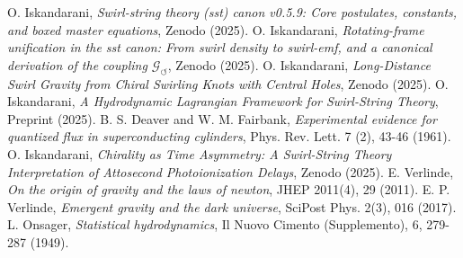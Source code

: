 \documentclass[10pt,reprint,aps,onecolumn,nofootinbib]{revtex4-2}
\begin{document}
        \begin{thebibliography}{99}
         O. Iskandarani, \emph{Swirl-string theory (sst) canon v0.5.9: Core postulates, constants, and boxed master equations}, Zenodo (2025).
         O. Iskandarani, \emph{Rotating-frame unification in the sst canon: From swirl density to swirl-emf, and a canonical derivation of the coupling $\mathcal{G}_{\circlearrowleft}$}, Zenodo (2025).
         O. Iskandarani, \emph{Long-Distance Swirl Gravity from Chiral Swirling Knots with Central Holes}, Zenodo (2025).
         O. Iskandarani, \emph{A Hydrodynamic Lagrangian Framework for Swirl-String Theory}, Preprint (2025).
         B. S. Deaver and W. M. Fairbank, \emph{Experimental evidence for quantized flux in superconducting cylinders}, Phys. Rev. Lett. 7 (2), 43-46 (1961).
         O. Iskandarani, \emph{Chirality as Time Asymmetry: A Swirl-String Theory Interpretation of Attosecond Photoionization Delays}, Zenodo (2025).
         E. Verlinde, \emph{On the origin of gravity and the laws of newton}, JHEP 2011(4), 29 (2011).
         E. P. Verlinde, \emph{Emergent gravity and the dark universe}, SciPost Phys. 2(3), 016 (2017).
         L. Onsager, \emph{Statistical hydrodynamics}, Il Nuovo Cimento (Supplemento), 6, 279-287 (1949).
        \end{thebibliography}

\appendix
\end{document}
